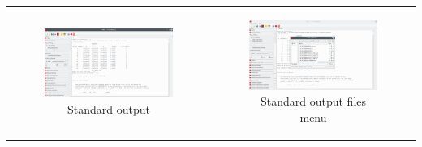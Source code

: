 \documentclass[10pt]{article}
\begin{document}
\begin{center}
\begin{tabular}{cc}
\begin{minipage}{.48\linewidth}
\begin{figure}[H]
\begin{center}
\includegraphics[width=.9\linewidth]{damqt320_standard_output.png}
\end{center}
\caption{{Standard output} \label{fig:2_2_2}}
\end{figure}
\end{minipage}
&
\begin{minipage}{.48\linewidth}
\begin{figure}[H]
\begin{center}
\includegraphics[width=.9\linewidth]{damqt320_output_files_menu.png}
\end{center}
\caption{{Standard output files menu}\label{fig:2_2_3}}
\end{figure}
\end{minipage}
\end{tabular}
\end{center}


\end{document}
